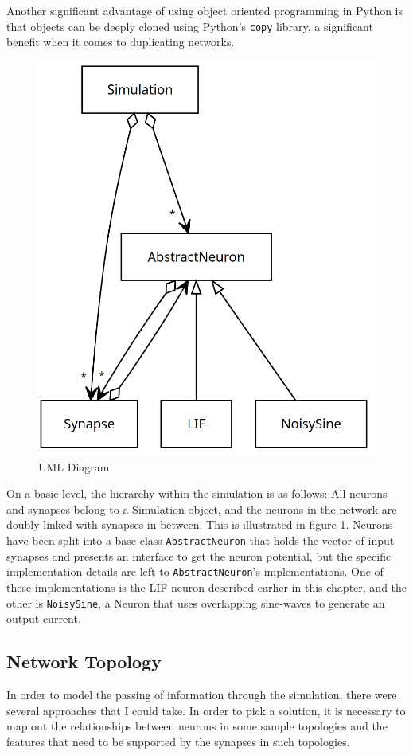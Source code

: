 Another significant advantage of using object oriented programming in Python is
that objects can be deeply cloned using Python's \texttt{copy} library, a significant benefit when it comes to
duplicating networks. 

\begin{figure}[h!]
    \centering
    \includegraphics[width=0.5\linewidth]{figures/images/UML2.png}
    \caption{UML Diagram}
    \label{fig:uml}
\end{figure}

On a basic level, the hierarchy within the simulation is as follows: All neurons
and synapses belong to a Simulation object, and the neurons in the network are
doubly-linked with synapses in-between. This is illustrated in figure
\ref{fig:uml}. Neurons have been split into a base class \texttt{AbstractNeuron}
that holds the vector of input synapses and presents an interface to get the
neuron potential, but the specific implementation details are left to
\texttt{AbstractNeuron}'s implementations. One of these implementations is the
LIF neuron described earlier in this chapter, and the other is
\texttt{NoisySine}, a Neuron that uses overlapping sine-waves to generate an
output current. 

\subsection{Network Topology}

In order to model the passing of information through the simulation, there were
several approaches that I could take. In order to pick a solution, it is
necessary to map out the relationships between neurons in some sample topologies
and the features that need to be supported by the synapses in such topologies.

